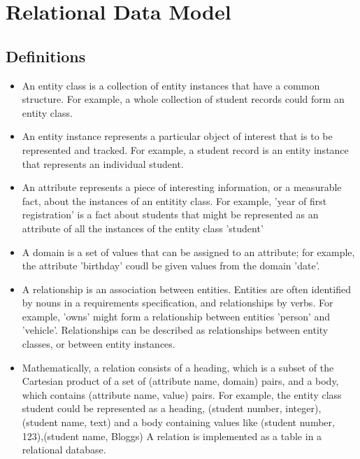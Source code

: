 \documentclass[10pt]{article}
\begin{document}
  \section*{Relational Data Model}
    \subsection*{Definitions}
    \begin{itemize}
      \item An entity class is a collection of entity instances that have a common structure.
      For example, a whole collection of student records could form an entity class.

      \item An entity instance represents a particular object of interest that is to be represented
      and tracked. For example, a student record is an entity instance that
      represents an individual student.

      \item An attribute represents a piece of interesting information, or a measurable fact,
      about the instances of an entitity class. For example, ’year of first registration’
      is a fact about students that might be represented as an attribute of all the
      instances of the entity class ’student’

      \item A domain is a set of values that can be assigned to an attribute; for example,
      the attribute ’birthday’ coudl be given values from the domain ’date’.

      \item A relationship is an association between entities. Entities are often identified by
      nouns in a requirements specification, and relationships by verbs. For example,
      ’owns’ might form a relationship between entities ’person’ and ’vehicle’. Relationships
      can be described as relationships between entity classes, or between
      entity instances.

      \item Mathematically, a relation consists of a heading, which is a subset of the Cartesian
      product of a set of (attribute name, domain) pairs, and a body, which contains
      (attribute name, value) pairs. For example, the entity class student could be
      represented as a heading, (student number, integer), (student name, text) and
      a body containing values like (student number, 123),(student name, Bloggs)
      A relation is implemented as a table in a relational database.


\end{itemize}
\end{document}
